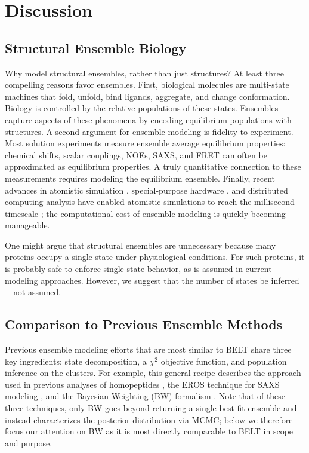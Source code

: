 \documentclass[12pt]{article}
\begin{document}
\section*{Discussion}

\subsection*{Structural Ensemble Biology}

Why model structural ensembles, rather than just structures?  At least three compelling reasons favor ensembles.  First, biological molecules are multi-state machines that fold, unfold, bind ligands, aggregate, and change conformation.  Biology is controlled by the relative populations of these states.  Ensembles capture aspects of these phenomena by encoding equilibrium populations with structures.  A second argument for ensemble modeling is fidelity to experiment.  Most solution experiments measure ensemble average equilibrium properties: chemical shifts, scalar couplings, NOEs, SAXS, and FRET can often be approximated as equilibrium properties.  A truly quantitative connection to these measurements requires modeling the equilibrium ensemble.  Finally, recent advances in atomistic simulation  \cite{hess2008, pronk2013gromacs, eastman2012openmm, eastman2010openmm}, special-purpose hardware  \cite{Shaw2008}, and distributed computing analysis  \cite{emma, msmb2} have enabled atomistic simulations to 
reach the millisecond timescale  \cite{voelz2010, bowman2011atomistic, shaw2010, Shaw2011}; the computational cost of ensemble modeling is quickly becoming manageable.

One might argue that structural ensembles are unnecessary because many proteins occupy a single state under physiological conditions.  For such proteins, it is probably safe to enforce single state behavior, as is assumed in current modeling approaches. However, we suggest that the number of states be inferred---not assumed.  

\subsection*{Comparison to Previous Ensemble Methods}

Previous ensemble modeling efforts that are most similar to BELT share three key ingredients: state decomposition, a $\chi^2$ objective function, and population inference on the clusters.  For example, this general recipe describes the approach used in previous analyses of homopeptides  \cite{Graf2007}, the EROS technique for SAXS modeling  \cite{rozycki2011saxs}, and the Bayesian Weighting (BW) formalism  \cite{fisher2010, fisher2012efficient}.  Note that of these three techniques, only BW goes beyond returning a single best-fit ensemble and instead characterizes the posterior distribution via MCMC; below we therefore focus our attention on BW as it is most directly comparable to BELT in scope and purpose.
\end{document}
